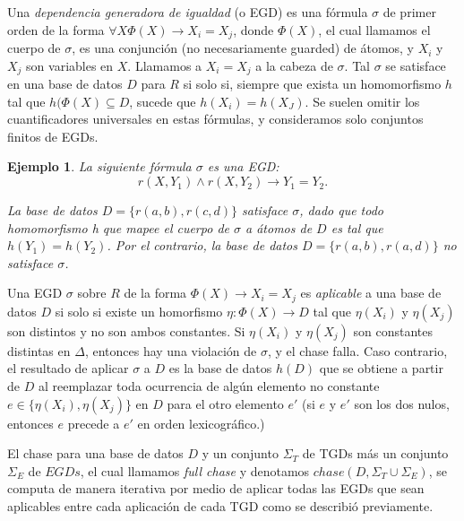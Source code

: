 \documentclass[11pt,a4paper,twoside]{tesis}
\newtheorem{exmp}{Ejemplo}
\begin{document}
Una \textit{dependencia generadora de igualdad} (o EGD) es una fórmula $\sigma$ de primer orden de la forma $\forall X \Phi(X) \rightarrow X_i = X_j$, donde $\Phi(X)$, el cual llamamos el cuerpo de $\sigma$, es una conjunción (no necesariamente guarded) de átomos, y $X_i$ y $X_j$ son variables en $X$. Llamamos a $X_i = X_j$ a la cabeza de $\sigma$. Tal $\sigma$ se satisface en una base de datos $D$ para $R$ si solo si, siempre que exista un homomorfismo $h$ tal que $h(\Phi(X) \subseteq D$, sucede que $h(X_i) = h(X_J)$. Se suelen omitir los cuantificadores universales en estas fórmulas, y consideramos solo conjuntos finitos de EGDs.

\begin{exmp}
La siguiente fórmula $\sigma$ es una EGD: $$r(X, Y_1) \land r(X,Y_2) \rightarrow Y_1 = Y_2.$$

La base de datos $D = \{r(a, b), r(c, d)\}$ satisface $\sigma$, dado que todo homomorfismo h que mapee el cuerpo de $\sigma$ a átomos de $D$ es tal que $h(Y_1) = h(Y_2)$. Por el contrario, la base de datos $D = \{r(a, b), r(a, d)\}$ no satisface $\sigma$.

\end{exmp}

Una EGD $\sigma$ sobre $R$ de la forma $\Phi(X) \rightarrow X_i = X_j$ es \textit{aplicable} a una base de datos $D$ si solo si existe un homorfismo $\eta : \Phi(X) \rightarrow D$ tal que $\eta(X_i)$ y $\eta(X_j)$ son distintos y no son ambos constantes. Si $\eta(X_i)$ y $\eta(X_j)$ son constantes distintas en $\Delta$, entonces hay una violación de $\sigma$, y el chase falla. Caso contrario, el resultado de aplicar $\sigma$ a $D$ es la base de datos $h(D)$ que se obtiene a partir de $D$ al reemplazar toda ocurrencia de algún elemento no constante $e \in \{\eta(X_i), \eta(X_j)\}$ en $D$ para el otro elemento $e\prime$ (si $e$ y $e\prime$ son los dos nulos, entonces $e$ precede a $e\prime$ en orden lexicográfico.)

El chase para una base de datos $D$ y un conjunto $\Sigma_T$ de TGDs más un conjunto $\Sigma_E$ de $EGDs$, el cual llamamos \textit{full chase} y denotamos $chase(D, \Sigma_T \cup \Sigma_E)$, se computa de manera iterativa por medio de aplicar todas las EGDs que sean aplicables entre cada aplicación de cada TGD como se describió previamente.
\end{document}
